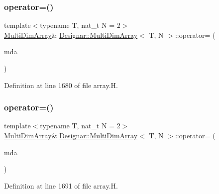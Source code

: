 \subsubsection{\texorpdfstring{operator=()}{operator=()}\hspace{0.1cm}{\footnotesize\ttfamily [1/2]}}
{\footnotesize\ttfamily template$<$typename T, nat\+\_\+t N = 2$>$ \\
\hyperlink{class_designar_1_1_multi_dim_array}{Multi\+Dim\+Array}\& \hyperlink{class_designar_1_1_multi_dim_array}{Designar\+::\+Multi\+Dim\+Array}$<$ T, N $>$\+::operator= (\begin{DoxyParamCaption}\item[{const \hyperlink{class_designar_1_1_multi_dim_array}{Multi\+Dim\+Array}$<$ T, N $>$ \&}]{mda }\end{DoxyParamCaption})\hspace{0.3cm}{\ttfamily [inline]}}



Definition at line 1680 of file array.\+H.

\mbox{\label{class_designar_1_1_multi_dim_array_a45e425f7a1795d97822d8fafe5c02244}} 
\subsubsection{\texorpdfstring{operator=()}{operator=()}\hspace{0.1cm}{\footnotesize\ttfamily [2/2]}}
{\footnotesize\ttfamily template$<$typename T, nat\+\_\+t N = 2$>$ \\
\hyperlink{class_designar_1_1_multi_dim_array}{Multi\+Dim\+Array}\& \hyperlink{class_designar_1_1_multi_dim_array}{Designar\+::\+Multi\+Dim\+Array}$<$ T, N $>$\+::operator= (\begin{DoxyParamCaption}\item[{\hyperlink{class_designar_1_1_multi_dim_array}{Multi\+Dim\+Array}$<$ T, N $>$ \&\&}]{mda }\end{DoxyParamCaption})\hspace{0.3cm}{\ttfamily [inline]}}



Definition at line 1691 of file array.\+H.

\mbox{\label{class_designar_1_1_multi_dim_array_a39d5dcd40ce04bf3113c0f6d83805d0a}} 
